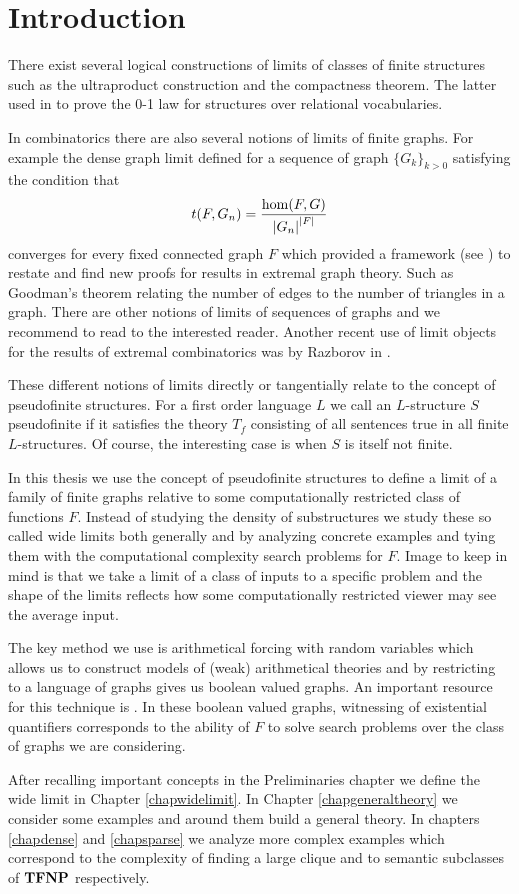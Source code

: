 \chapter*{Introduction}

There exist several logical constructions of limits of classes of finite structures such as the ultraproduct construction and the compactness theorem. The latter used in \cite{Fagin1976} to prove the 0-1 law for structures over relational vocabularies.

In combinatorics there are also several notions of limits of finite graphs. For example the dense graph limit defined for a sequence of graph $\{G_k\}_{k>0}$ satisfying the condition that
\[t(F,G_n)=\frac{\hom(F,G)}{\left|{G_n}\right|^{\left|{F}\right|}}\]
converges for every fixed connected graph $F$ which provided a framework (see \cite{lovasz2006limits}) to restate and find new proofs for results in extremal graph theory. Such as Goodman's theorem relating the number of edges to the number of triangles in a graph. There are other notions of limits of sequences of graphs and we recommend to read \cite{Nesetril2013} to the interested reader. Another recent use of limit objects for the results of extremal combinatorics was by Razborov in \cite{razborov2007flag}.

These different notions of limits directly or tangentially relate to the concept of pseudofinite structures. For a first order language $L$ we call an $L$-structure $S$ pseudofinite if it satisfies the theory $T_f$ consisting of all sentences true in all finite $L$-structures. Of course, the interesting case is when $S$ is itself not finite.

In this thesis we use the concept of pseudofinite structures to define a limit of a family of finite graphs relative to some computationally restricted class of functions $F$. Instead of studying the density of substructures we study these so called wide limits both generally and by analyzing concrete examples and tying them with the computational complexity search problems for $F$. Image to keep in mind is that we take a limit of a class of inputs to a specific problem and the shape of the limits reflects how some computationally restricted viewer may see the average input.

The key method we use is arithmetical forcing with random variables which allows us to construct models of (weak) arithmetical theories and by restricting to a language of graphs gives us boolean valued graphs. An important resource for this technique is \cite{krajicek2010forcing}. In these boolean valued graphs, witnessing of existential quantifiers corresponds to the ability of $F$ to solve search problems over the class of graphs we are considering.

After recalling important concepts in the Preliminaries chapter we define the wide limit in Chapter \ref{chapwidelimit}. In Chapter \ref{chapgeneraltheory} we consider some examples and around them build a general theory. In chapters \ref{chapdense} and \ref{chapsparse} we analyze more complex examples which correspond to the complexity of finding a large clique and to semantic subclasses of $\textbf{TFNP}$ respectively. 
